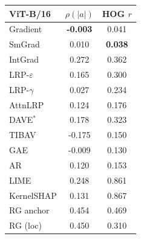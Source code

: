 \begin{tabular}[t]{@{}lcc@{}}
\toprule
\textbf{ViT-B/16} & $\rho(|a|)$ & HOG $r$ \\
\midrule
Gradient & \textbf{-0.003} & 0.041 \\
SmGrad & 0.010 & \textbf{0.038} \\
IntGrad & 0.272 & 0.362 \\
LRP-$\varepsilon$ & 0.165 & 0.300 \\
LRP-$\gamma$ & 0.027 & 0.234 \\
AttnLRP & 0.124 & 0.176 \\
DAVE$^{*}$ & 0.178 & 0.323 \\
TIBAV & -0.175 & 0.150 \\
GAE & -0.009 & 0.130 \\
AR & 0.120 & 0.153 \\
LIME & 0.248 & 0.861 \\
KernelSHAP & 0.131 & 0.867 \\
RG anchor & 0.454 & 0.469 \\
RG (loc) & 0.450 & 0.310 \\
\bottomrule
\end{tabular}

